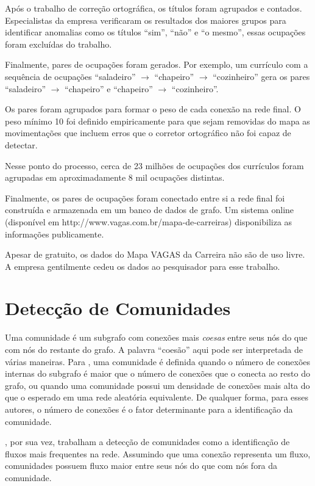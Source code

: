 \documentclass[
  article,
  11pt,
  a4paper,
  english,
  brazil,
  sumario=tradicional]{abntex2}
\begin{document}
Após o trabalho de correção ortográfica, os títulos foram agrupados e contados. Especialistas da empresa verificaram os resultados dos maiores grupos para identificar anomalias como os títulos \enquote{sim}, \enquote{não} e \enquote{o mesmo}, essas ocupações foram excluídas do trabalho.

Finalmente, pares de ocupações foram gerados. Por exemplo, um currículo com a sequência de ocupações \enquote{saladeiro} $\to$ \enquote{chapeiro} $\to$ \enquote{cozinheiro} gera os pares \enquote{saladeiro} $\to$ \enquote{chapeiro} e \enquote{chapeiro} $\to$ \enquote{cozinheiro}.

Os pares foram agrupados para formar o peso de cada conexão na rede final. O peso mínimo 10 foi definido empiricamente para que sejam removidas do mapa as movimentações que incluem erros que o corretor ortográfico não foi capaz de detectar.

Nesse ponto do processo, cerca de 23 milhões de ocupações dos currículos foram agrupadas em aproximadamente 8 mil ocupações distintas.

Finalmente, os pares de ocupações foram conectado entre si a rede final foi construída e armazenada em um banco de dados de grafo. Um sistema online (disponível em http://www.vagas.com.br/mapa-de-carreiras) disponibiliza as informações publicamente.

Apesar de gratuito, os dados do Mapa VAGAS da Carreira não são de uso livre. A empresa gentilmente cedeu os dados ao pesquisador para esse trabalho.

\section{Detecção de Comunidades}

Uma comunidade é um subgrafo com conexões mais \textit{coesas} entre seus nós do que com nós do restante do grafo. A palavra \enquote{coesão} aqui pode ser interpretada de várias maneiras. Para , uma comunidade é definida quando o número de conexões internas do subgrafo é maior que o número de conexões que o conecta ao resto do grafo, ou quando uma comunidade possui um densidade de conexões mais alta do que o esperado em uma rede aleatória equivalente. De qualquer forma, para esses autores, o número de conexões é o fator determinante para a identificação da comunidade.

, por sua vez, trabalham a detecção de comunidades como a identificação de fluxos mais frequentes na rede. Assumindo que uma conexão representa um fluxo, comunidades possuem fluxo maior entre seus nós do que com nós fora da comunidade.
\end{document}
